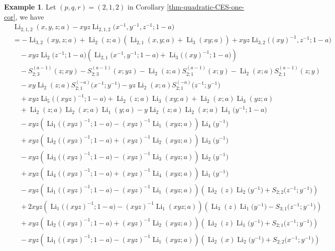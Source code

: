 \documentclass[11pt]{article}
\DeclareMathOperator{\Li}{Li}
\theoremstyle{plain}
\theoremstyle{definition}
\newtheorem{exa}[thm]{Example}
\begin{document}
\begin{exa}
	Let $(p,q,r)=(2,1,2)$ in Corollary \ref{thm-quadratic-CES-one-cor}, we have
\begin{align*}
	&\Li_{2,1,2}(x,y,z;a)	-xyz\Li_{2,1,2}\Big(x^{-1},y^{-1},z^{-1};1-a\Big)\\
	&=-\Li_{3,2}(xy,z;a)+\Li_{2}(z;a)\left(\Li_{2,1}(x,y;a)+\Li_{3}(xy;a)\right)+xyz\Li_{3,2}\Big((xy)^{-1},z^{-1};1-a\Big)\\
	&\quad-xyz\Li_{2}\Big(z^{-1};1-a\Big)\left(\Li_{2,1}\Big(x^{-1},y^{-1};1-a\Big)+\Li_{3}\Big((xy)^{-1};1-a\Big)\right)\\
	&\quad-S_{2;3}^{(a-1)}(z;xy)-S_{2;3}^{(a-1)}(x;yz)-\Li_{2}(z;a)S_{2;1}^{(a-1)}(x;y)-\Li_{2}(x;a)S_{2;1}^{(a-1)}(z;y)\nonumber\\
	&\quad-xy\Li_{2}(z;a)S_{2;1}^{(-a)}\Big(x^{-1};y^{-1}\Big)-yz\Li_{2}(x;a)S_{2;1}^{(-a)}\Big(z^{-1};y^{-1}\Big)\nonumber\\
	&\quad+xyz\Li_{5}\Big((xyz)^{-1};1-a\Big)+\Li_{2}(z;a)\Li_{3}(xy;a)+\Li_{2}(x;a)\Li_{3}(yz;a)\nonumber\\
	&\quad+\Li_{2}(z;a)\Li_{2}(x;a)\Li_1(y;a)-y\Li_{2}(z;a)\Li_{2}(x;a)\Li_1\Big(y^{-1};1-a\Big)\nonumber\\
	&\quad-xyz\left(\Li_{1}\Big((xyz)^{-1};1-a\Big)-(xyz)^{-1}\Li_{1}(xyz;a)\right)\Li_{4}\Big(y^{-1}\Big)\\
	&\quad+xyz\left(\Li_{2}\Big((xyz)^{-1};1-a\Big)+(xyz)^{-1}\Li_{2}(xyz;a)\right)\Li_{3}\Big(y^{-1}\Big)\nonumber\\
	&\quad-xyz\left(\Li_{3}\Big((xyz)^{-1};1-a\Big)-(xyz)^{-1}\Li_{3}(xyz;a)\right)\Li_{2}\Big(y^{-1}\Big)\\
	&\quad+xyz\left(\Li_{4}\Big((xyz)^{-1};1-a\Big)+(xyz)^{-1}\Li_{4}(xyz;a)\right)\Li_{1}\Big(y^{-1}\Big)\nonumber\\
	&\quad-xyz\left(\Li_{1}\Big((xyz)^{-1};1-a\Big)-(xyz)^{-1} \Li_{1}(xyz;a)\right)\left(\Li_{2}(z)\Li_{2}\Big(y^{-1}\Big)+S_{2;2}\Big(z^{-1};y^{-1}\Big)\right)\nonumber\\
	&\quad+2xyz\left(\Li_{1}\Big((xyz)^{-1};1-a\Big)-(xyz)^{-1} \Li_{1}(xyz;a)\right)\left(\Li_{3}(z)\Li_{1}\Big(y^{-1}\Big)-S_{3;1}\Big(z^{-1};y^{-1}\Big)\right)\nonumber\\
	&\quad+xyz\left(\Li_{2}\Big((xyz)^{-1};1-a\Big)+(xyz)^{-1} \Li_{2}(xyz;a)\right)\left(\Li_{2}(z)\Li_{1}\Big(y^{-1}\Big)+S_{2;1}\Big(z^{-1};y^{-1}\Big)\right)\nonumber\\
	&\quad-xyz\left(\Li_{1}\Big((xyz)^{-1};1-a\Big)-(xyz)^{-1} \Li_{1}(xyz;a)\right)\left(\Li_{2}(x)\Li_{2}\Big(y^{-1}\Big)+S_{2;2}\Big(x^{-1};y^{-1}\Big)\right)\nonumber\\

\end{align*}
\end{exa}
\end{document}
